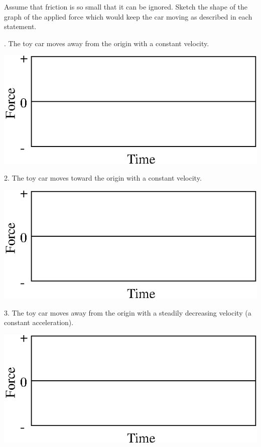 Assume that friction is so small that it can be ignored. Sketch the shape of
the graph of the applied force which would keep the car moving as described
in each statement.

. The toy car moves away from the origin with a constant velocity.

\vspace{0.3cm}
{\par\centering \includegraphics{force2/force2_fig7.eps} \par}
\vspace{0.3cm}

2. The toy car moves toward the origin with a constant velocity.

\vspace{0.3cm}
{\par\centering \includegraphics{force2/force2_fig7.eps} \par}
\vspace{0.3cm}

3. The toy car moves away from the origin with a steadily decreasing velocity
(a constant acceleration).

\vspace{0.3cm}
{\par\centering \includegraphics{force2/force2_fig7.eps} \par}
\vspace{0.3cm}

